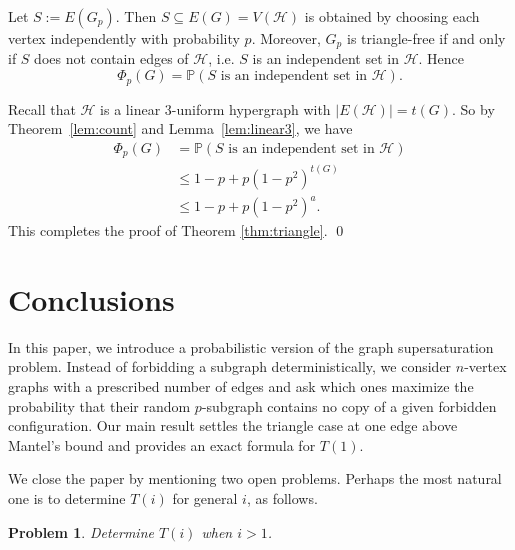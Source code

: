 \documentclass[11pt,a4paper]{article}
\newcommand{\cH}{\mathcal{H}}
\newtheorem{problem}{Problem}
\begin{document}
Let $S:=E(G_p)$. Then $S\subseteq E(G)=V(\cH)$ is obtained by choosing each vertex
independently with probability $p$. Moreover, $G_p$ is triangle-free 
if and only if $S$ does not contain edges of $\cH$, i.e. $S$ is an independent set in $\cH$. Hence
$$
\Phi_p(G)=\mathbb P(S \text{ is an independent set in } \cH).
$$

Recall that  $\cH$ is a linear 3-uniform hypergraph with $|E(\cH)|=t(G)$. So by Theorem~\ref{lem:count} and Lemma~\ref{lem:linear3}, we have
\begin{align*}
\Phi_p(G)&=\mathbb P(S \text{ is an independent set in } \cH)\\
&\le 1-p+p(1-p^2)^{t(G)}\\
&\le 1-p+p(1-p^2)^a.
\end{align*}
This completes the proof of Theorem \ref{thm:triangle}. \qed

\section{Conclusions}
\label{sec:conc}
In this paper, we introduce a probabilistic version of the graph supersaturation problem. Instead of forbidding a subgraph deterministically,  we consider $n$-vertex graphs with a prescribed number of edges and ask which ones maximize the probability that their random $p$-subgraph contains no copy of a given forbidden configuration. Our main result settles the triangle case at one edge above Mantel's bound and provides an exact formula for $T(1)$.

We close the paper by mentioning two open problems. Perhaps the most natural one is to determine $T(i)$ for general $i$, as follows.
\begin{problem}\label{prob:1}
    Determine $T(i)$ when $i > 1$.
\end{problem}
\end{document}
